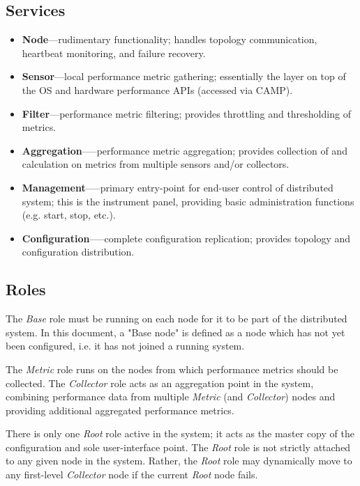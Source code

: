 \subsection{Services}

\begin{itemize}

\item \textbf{Node}---rudimentary \dcamp functionality; handles topology communication, heartbeat monitoring, and failure
      recovery.
\item \textbf{Sensor}---local performance metric gathering; essentially the \dcamp layer on top of the OS and hardware
      performance APIs (accessed via CAMP).
\item \textbf{Filter}---performance metric filtering; provides throttling and thresholding of metrics.
\item \textbf{Aggregation}--—performance metric aggregation; provides collection of and calculation on metrics from
      multiple sensors and/or collectors.
\item \textbf{Management}--—primary entry-point for end-user control of \dcamp distributed system; this is the \dcamp
      instrument panel, providing basic administration functions (e.g. start, stop, etc.).
\item \textbf{Configuration}--—complete configuration replication; provides topology and configuration distribution.

\end{itemize}

\subsection{Roles}

The \textit{Base} role must be running on each node for it to be part of the \dcamp distributed system. In this document,
a "Base node" is defined as a \dcamp node which has not yet been configured, i.e. it has not joined a running \dcamp
system.

The \textit{Metric} role runs on the nodes from which performance metrics should be collected. The \textit{Collector}
role acts as an aggregation point in the system, combining performance data from multiple \textit{Metric} (and
\textit{Collector}) nodes and providing additional aggregated performance metrics.

There is only one \textit{Root} role active in the system; it acts as the master copy of the \dcamp configuration and
sole user-interface point. The \textit{Root} role is not strictly attached to any given node in the system. Rather, the
\textit{Root} role may dynamically move to any first-level \textit{Collector} node if the current \textit{Root} node
fails.


